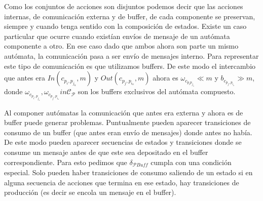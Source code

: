 \begin{definition}[Composición]
Como los conjuntos de acciones son disjuntos podemos decir que las acciones internas, de comunicación externa y de buffer, de cada componente se preservan, siempre y cuando tenga sentido con la composición de estados. Existe un caso particular que ocurre cuando existían envíos de mensaje de un autómata componente a otro. En ese caso dado que ambos ahora son parte un mismo autómata, la comunicación pasa a ser envío de mensajes interno. Para representar este tipo de comunicación es que utilizamos buffers. De este modo el intercambio que antes era $\mathit{In} (c_{p_i, p_{j_n}},m)$ y $\mathit{Out}(c_{p_j, p_{i_n}},m)$ ahora es $\omega_{c_{p_i p_{j_n}}}  \ll m$ y $b_{c_{p_j, p_{i_n}}}  \gg  m$, donde $ \omega_{c_{p_i, p_{j_n}}}, \omega_{c_{p_j, p_{i_n}}} in \mathcal{C}_{\mathcal{P}} $ son los buffers exclusivos del autómata compuesto. 

Al componer autómatas la comunicación que antes era externa y ahora es de buffer puede generar problemas. Puntualmente pueden aparecer transiciones de consumo de un buffer (que antes eran envío de mensajes) donde antes no había. De este modo pueden aparecer secuencias de estados y transiciones donde se consume un mensaje antes de que este sea depositado en el buffer correspondiente. Para esto pedimos que $\delta_\mathit{\mathcal{P}Buff}$ cumpla con una condición especial. Solo pueden haber transiciones de consumo saliendo de un estado si en alguna secuencia de acciones que termina en ese estado, hay transiciones de producción (es decir se encola un mensaje en el buffer).

\end{definition}

